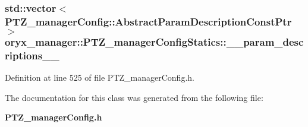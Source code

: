 \subsubsection[{\-\_\-\-\_\-param\-\_\-descriptions\-\_\-\-\_\-}]{\setlength{\rightskip}{0pt plus 5cm}std\-::vector$<${\bf \-P\-T\-Z\-\_\-manager\-Config\-::\-Abstract\-Param\-Description\-Const\-Ptr}$>$ {\bf oryx\-\_\-manager\-::\-P\-T\-Z\-\_\-manager\-Config\-Statics\-::\-\_\-\-\_\-param\-\_\-descriptions\-\_\-\-\_\-}\hspace{0.3cm}{\ttfamily  [private]}}\label{classoryx__manager_1_1PTZ__managerConfigStatics_a1f15d38e47aeb11d2e261f9c5b53d62c}


\-Definition at line 525 of file \-P\-T\-Z\-\_\-manager\-Config.\-h.



\-The documentation for this class was generated from the following file\-:\begin{DoxyCompactItemize}
\item 
{\bf \-P\-T\-Z\-\_\-manager\-Config.\-h}\end{DoxyCompactItemize}
